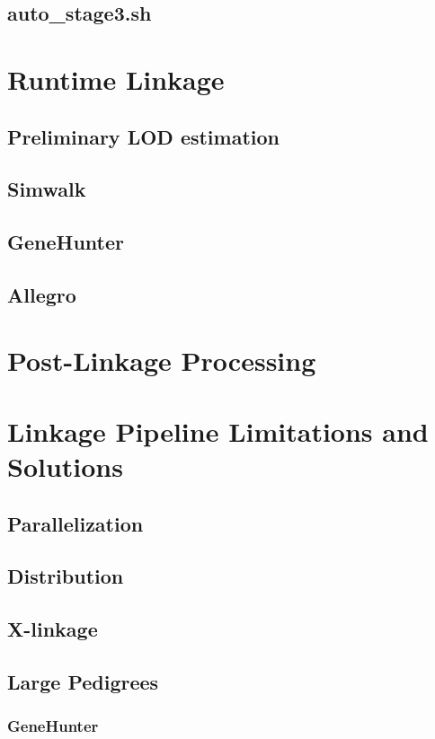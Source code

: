 \subsection{auto_stage3.sh}


\section{Runtime Linkage}
\subsection{Preliminary LOD estimation}
\subsection{Simwalk}
\subsection{GeneHunter}
\subsection{Allegro}

\section{Post-Linkage Processing}

\section{Linkage Pipeline Limitations and Solutions}
\subsection{Parallelization}
\subsection{Distribution}
\subsection{X-linkage}

\subsection{Large Pedigrees}
\subsubsection{GeneHunter}
